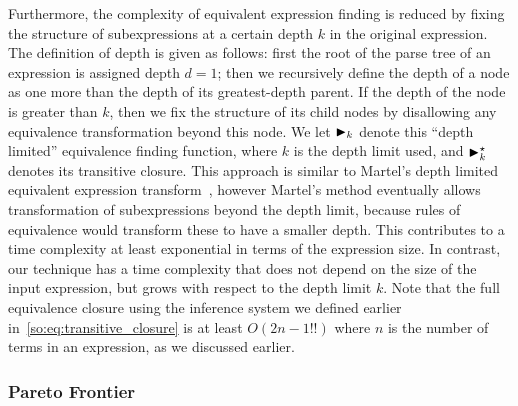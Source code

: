 Furthermore, the complexity of equivalent expression finding is reduced
by fixing the structure of subexpressions at a certain depth $k$ in the
original expression.  The definition of depth is given as follows: first
the root of the parse tree of an expression is assigned depth $d = 1$; then
we recursively define the depth of a node as one more than the depth of
its greatest-depth parent.  If the depth of the node is greater than $k$,
then we fix the structure of its child nodes by disallowing any equivalence
transformation beyond this node. We let $\operatorname{\blacktriangleright}_k$ denote this ``depth
limited'' equivalence finding function, where $k$ is the depth limit used, and
$\operatorname{\blacktriangleright}^\star_k$ denotes its transitive closure. This approach is similar to
Martel's depth limited equivalent expression transform~\cite{martel07}, however
Martel's method eventually allows transformation of subexpressions beyond the
depth limit, because rules of equivalence would transform these to have a
smaller depth.  This contributes to a time complexity at least exponential in
terms of the expression size. In contrast, our technique has a time complexity
that does not depend on the size of the input expression, but grows with
respect to the depth limit $k$. Note that the full equivalence closure using
the inference system we defined earlier in~\eqref{so:eq:transitive_closure} is
at least $O({2n - 1}!!)$ where $n$ is the number of terms in an expression, as
we discussed earlier.

\subsubsection{Pareto Frontier}

